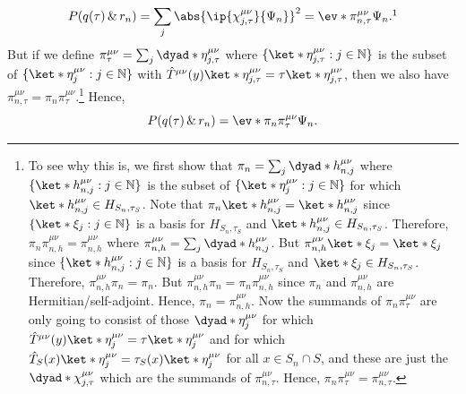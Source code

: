\documentclass[12pt]{report}
\begin{document}
\begin{equation}\label{pqtauri}
P(q(\tau)\, \& \,r_n)=\sum_j \abs{ \ip{\chi_{j,\tau}^{\mu\nu}}{\Psi_n}}^2=\ev*{\pi_{n,\tau}^{\mu\nu}}{\Psi_n}.\protect\footnotemark
\end{equation}
But %
%
 if we define $\pi_\tau^{\mu\nu}=\sum_j\dyad*{\eta_{j,\tau}^{\mu\nu}}$ where $\{\ket*{\eta_{j,\tau}^{\mu\nu}}:j\in\mathbb{N}\}$ is %
  the subset of  $\{\ket*{\eta_j^{\mu\nu}}:j\in\mathbb{N}\}$ with $\hat{T}^{\mu\nu}(y)\ket*{\eta_{j,\tau}^{\mu\nu}}=\tau\ket*{\eta_{j,\tau}^{\mu\nu}}$, then we also have  $\pi_{n,\tau}^{\mu\nu}=\pi_n\pi_\tau^{\mu\nu}$.\footnote{To see why this is, 
we first show that $\pi_n=\sum_j\dyad*{h_{n,j}^{\mu\nu}}$ where $\{\ket*{h_{n,j}^{\mu\nu}}:j\in\mathbb{N}\}$ is the subset of $\{\ket*{\eta_j^{\mu\nu}}:j\in\mathbb{N}\}$  for which $\ket*{h_{n,j}^{\mu\nu}}\in H_{S_n,\tau_S}$. 
Note that $\pi_n\ket*{h_{n,j}^{\mu\nu}}=\ket*{h_{n,j}^{\mu\nu}}$    since $\{\ket*{\xi_j}:j\in\mathbb{N}\}$ is a basis for $H_{S_n,\tau_S}$ and $\ket*{h_{n,j}^{\mu\nu}}\in H_{S_n,\tau_S}$. 
Therefore, $\pi_n\pi_{n,h}^{\mu\nu}=\pi_{n,h}^{\mu\nu}$  where  $\pi_{n,h}^{\mu\nu}=\sum_j\dyad*{h_{n,j}^{\mu\nu}}$. 
But  $\pi_{n,h}^{\mu\nu}\ket*{\xi_j}=\ket*{\xi_j}$ since $\{\ket*{h_{n,j}^{\mu\nu}}:j\in\mathbb{N}\}$ is a basis for $H_{S_n,\tau_S}$ and $\ket*{\xi_j}\in H_{S_n,\tau_S}$. 
Therefore, $\pi_{n,h}^{\mu\nu}\pi_n=\pi_n.$ But $\pi_{n,h}^{\mu\nu}\pi_n= \pi_n\pi_{n,h}^{\mu\nu}$ since $\pi_n$ and $\pi_{n,h}^{\mu\nu}$ are Hermitian/self-adjoint. Hence, $\pi_n= \pi_{n,h}^{\mu\nu}$. Now the summands of $\pi_n\pi_\tau^{\mu\nu}$ are only going to consist of those $\dyad*{\eta_j^{\mu\nu}}$ for which $\hat{T}^{\mu\nu}(y)\ket*{\eta_j^{\mu\nu}}=\tau\ket*{\eta_j^{\mu\nu}}$ and for which $\hat{T}_S(x)\ket*{\eta_j^{\mu\nu}}=\tau_S(x)\ket*{\eta_j^{\mu\nu}}$ for all $x\in S_n\cap S$, and these are just the $\dyad*{\chi_{j,\tau}^{\mu\nu}}$ which are the summands of  $\pi_{n,\tau}^{\mu\nu}$. Hence,  $\pi_n\pi_\tau^{\mu\nu}=\pi_{n,\tau}^{\mu\nu}.$} 
  Hence,
\begin{equation}\label{pqtauri2}
P(q(\tau)\, \& \, r_n)=\ev*{\pi_n\pi_\tau^{\mu\nu}}{\Psi_n}.
\end{equation}
\end{document}
